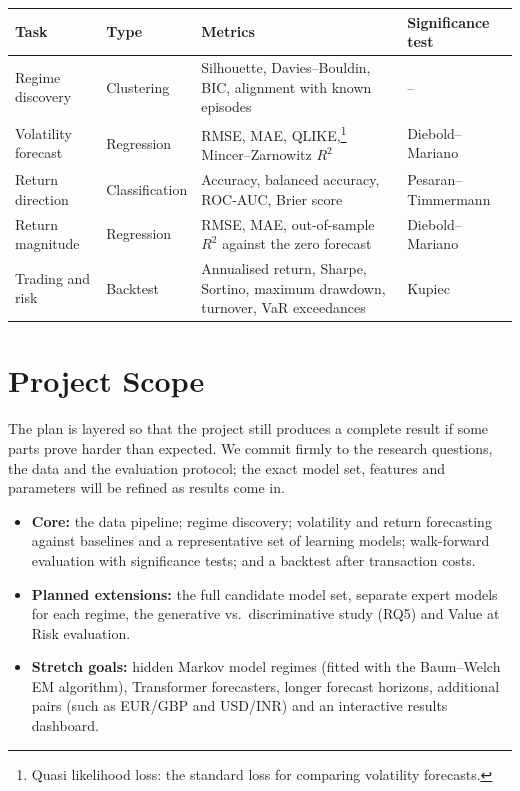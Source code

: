 \documentclass[11pt,a4paper]{article}
\begin{document}
{\small
\begin{xltabular}{\linewidth}{>{\raggedright\arraybackslash}p{2.9cm} >{\raggedright\arraybackslash}p{2.2cm} Y >{\raggedright\arraybackslash}p{4.0cm}}
\toprule
\textbf{Task} & \textbf{Type} & \textbf{Metrics} & \textbf{Significance test} \\
\midrule
\endhead
Regime discovery    & Clustering     & Silhouette, Davies--Bouldin, BIC, alignment with known episodes & -- \\*
Volatility forecast & Regression     & RMSE, MAE, QLIKE,\footnote{Quasi likelihood loss: the standard loss for comparing volatility forecasts.} Mincer--Zarnowitz $R^2$     & Diebold--Mariano \\*
Return direction    & Classification & Accuracy, balanced accuracy, ROC-AUC, Brier score               & Pesaran--Timmermann \\*
Return magnitude    & Regression     & RMSE, MAE, out-of-sample $R^2$ against the zero forecast & Diebold--Mariano \\*
Trading and risk    & Backtest       & Annualised return, Sharpe, Sortino, maximum drawdown, turnover, VaR exceedances & Kupiec \\*
\bottomrule
\end{xltabular}}

\section*{Project Scope}
The plan is layered so that the project still produces a complete result if some parts prove harder than
expected. We commit firmly to the research questions, the data and the evaluation protocol; the exact model
set, features and parameters will be refined as results come in.
\begin{itemize}
  \item \textbf{Core:} the data pipeline; regime discovery; volatility and return forecasting against baselines and a representative set of learning models; walk-forward evaluation with
        significance tests; and a backtest after transaction costs.
  \item \textbf{Planned extensions:} the full candidate model set, separate expert models for each regime, the
        generative vs.\ discriminative study (RQ5) and Value at Risk evaluation.
  \item \textbf{Stretch goals:} hidden Markov model regimes (fitted with the Baum--Welch EM algorithm),
        Transformer forecasters, longer forecast horizons, additional pairs (such as EUR/GBP and USD/INR) and an interactive results dashboard.
\end{itemize}
\end{document}
